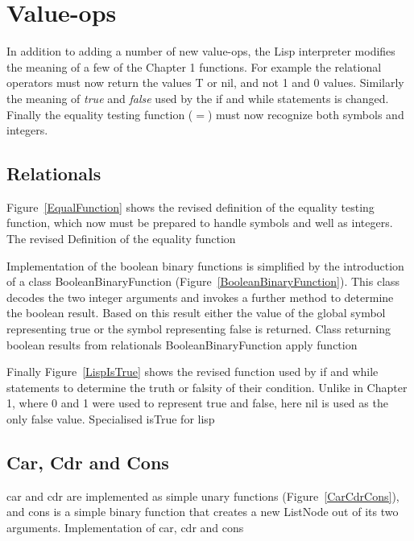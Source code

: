 \section{Value-ops}

In addition to adding a number of new value-ops, the Lisp interpreter modifies
the meaning of a few of the Chapter 1 functions.  For example the relational
operators must now return the values {\sf T} or {\sf nil}, and not 1 and 0
values.  Similarly the meaning of {\em true} and {\em false} used by the {\sf
    if} and {\sf while} statements is changed.  Finally the equality testing
function ($=$) must now recognize both symbols and integers.

\subsection{Relationals}

Figure~\ref{EqualFunction} shows the revised definition of the equality testing
function, which now must be prepared to handle symbols and well as integers.
%
{The revised Definition of the equality function}

Implementation of the boolean binary functions is simplified by the introduction
of a class {\sf BooleanBinaryFunction} (Figure~\ref{BooleanBinaryFunction}).
This class decodes the two integer arguments and invokes a further method to
determine the boolean result.  Based on this result either the value of the
global symbol representing true or the symbol representing false is returned.
%
{Class returning boolean results from relationals}
%
{{\sf BooleanBinaryFunction} apply function}

Finally Figure~\ref{LispIsTrue} shows the revised function used by {\sf if} and
{\sf while} statements to determine the truth or falsity of their condition.
Unlike in Chapter 1, where 0 and 1 were used to represent true and false, here
{\sf nil} is used as the only false value.
%
{Specialised {\sf isTrue} for lisp}

\subsection{Car, Cdr and Cons}

{\sf car} and {\sf cdr} are implemented as simple unary functions
(Figure~\ref{CarCdrCons}), and {\sf cons} is a simple binary function that
creates a new {\sf ListNode} out of its two arguments.
%
{{Implementation of {\sf car}, {\sf cdr} and {\sf cons}}}

